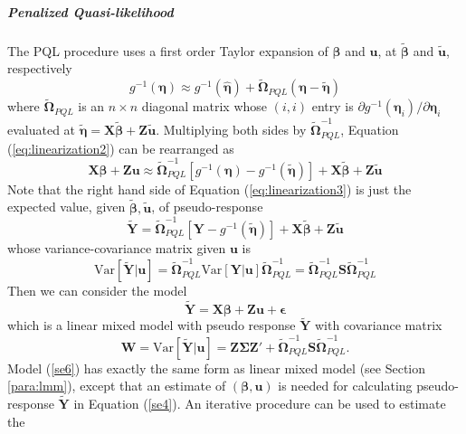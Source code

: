 \subparagraph*{Penalized Quasi-likelihood}
The PQL procedure uses a first order Taylor expansion of $\bm \beta$ and $\bm u$, at $\tilde{\bm
	\beta} $ and $ \tilde{\bm u} $, respectively
\begin{equation}\label{eq:linearization2}
g^{-1}(\bm\eta) \approx g^{-1}(\hat{\bm \eta}) + \tilde{\bm \Omega}_{PQL}(\bm \eta-\tilde{\bm
	\eta})
\end{equation} 
where $\tilde{\bm \Omega}_{PQL}$ is an $n\times n$ diagonal matrix whose $(i, i)$ entry is 
$\partial {g^{-1}(\bm \eta_i)}/\partial \bm \eta_i $ evaluated at $\tilde{\bm \eta}= \bm X\tilde{\bm
	\beta} + \bm Z\tilde{\bm u}$. Multiplying both sides by $\bm \tilde{\bm\Omega}_{PQL}^{-1}$,
Equation
(\ref{eq:linearization2}) can be rearranged as 
\begin{equation}\label{eq:linearization3}
\bm {X\beta} + \bm {Zu} \approx \tilde{\bm \Omega}_{PQL}^{-1}[g^{-1}(\bm\eta)- g^{-1}(\tilde{\bm
	\eta})]  + \bm{X}\tilde{\bm \beta} + \bm Z\tilde{\bm u}
\end{equation}
Note that the right hand side of Equation (\ref{eq:linearization3}) is just the expected value,
given $\tilde{\bm \beta}, \tilde{\bm u}$, of	 pseudo-response 
\begin{equation}\label{se4}
\tilde{\bm Y }=\tilde{\bm \Omega}_{PQL}^{-1}[\bm Y- g^{-1}(\tilde{\bm \eta})]  + \bm{X}\tilde{\bm
	\beta} + \bm Z\tilde{\bm u}
\end{equation}
whose variance-covariance matrix given $\bm u$ is 
\begin{equation}\label{se5}
\text{Var}[\tilde{\bm Y }|\bm u] =\tilde{\bm \Omega}_{PQL}^{-1} \text{Var}[\bm Y|\bm u]\tilde{\bm
	\Omega}_{PQL}^{-1} = 
\tilde{\bm \Omega}_{PQL}^{-1} \bm S \tilde{\bm \Omega}_{PQL}^{-1}
\end{equation}
Then we can consider the model 
\begin{equation}\label{se6}
\tilde{\bm Y } = \bm{X\beta} + \bm {Zu}  + \bm \epsilon
\end{equation}
which is a linear mixed model with pseudo response $\tilde{\bm Y }$ with covariance matrix 
\begin{equation}
\bm W = \text{Var}[ \tilde{\bm Y } |\bm u] = \bm{Z\Sigma Z'} + \tilde{\bm \Omega}_{PQL}^{-1} \bm S
\tilde{\bm \Omega}_{PQL}^{-1}.
\end{equation}
Model (\ref{se6})  has exactly the same form as linear mixed model (see Section \ref{para:lmm}),
except that an estimate of $(\bm\beta, \bm u)$  is needed for calculating pseudo-response
$\tilde{\bm Y }$ in Equation (\ref{se4}). An iterative procedure can be used to estimate the
